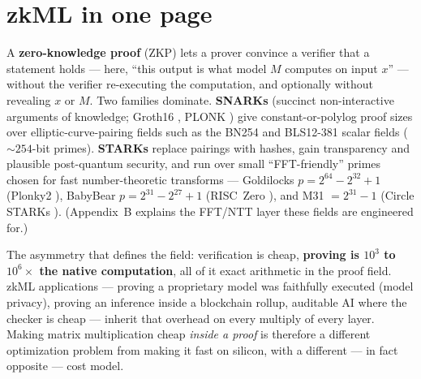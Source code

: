 \documentclass[10pt]{article}
\begin{document}
\begin{abstract}
{tax structurally}, proving at parity over identical traces; witness
generation inherits the exponent advantage with a crossover that is
field- \emph{and} substrate-dependent ($n \approx 64$ over
Goldilocks-CPU, $n \approx 10^3$ over BabyBear-CPU where 4-lane
NEON favors cheap multiplies, moot on the GPU where all algorithms
saturate memory bandwidth); and NTT field pricing is measured
across BabyBear, Goldilocks, BN254-Fr, and an Apple-GPU column. One
law organizes the machine-level results: the winning scheme is
decided by the substrate's scarce resource --- multiplies,
additions, or bytes --- and in modern AIR stacks the scarce
resource is committed rows, which is exactly what rank reduces. The
field-specific rank hunts continue.
\end{abstract}

\section{zkML in one page}\label{sec:zkml}

A \textbf{zero-knowledge proof} (ZKP) lets a prover convince a
verifier that a statement holds --- here, ``this output is what model
$M$ computes on input $x$'' --- without the verifier re-executing the
computation, and optionally without revealing $x$ or $M$. Two
families dominate. \textbf{SNARKs} (succinct non-interactive
arguments of knowledge; Groth16 \cite{groth16}, PLONK \cite{plonk})
give constant-or-polylog proof sizes over elliptic-curve-pairing
fields such as the BN254 and BLS12-381 scalar fields (${\sim}254$-bit
primes). \textbf{STARKs} \cite{stark} replace pairings with hashes,
gain transparency and plausible post-quantum security, and run over
small ``FFT-friendly'' primes chosen for fast number-theoretic
transforms --- Goldilocks $p = 2^{64} - 2^{32} + 1$ (Plonky2
\cite{plonky2}), BabyBear $p = 2^{31} - 2^{27} + 1$ (RISC~Zero
\cite{risc0}), and M31 $= 2^{31}-1$ (Circle STARKs \cite{circle}). (Appendix~B explains the FFT/NTT layer these fields are engineered for.)

The asymmetry that defines the field: verification is cheap,
\textbf{proving is $10^3$ to $10^6\times$ the native computation}, all
of it exact arithmetic in the proof field. zkML applications ---
proving a proprietary model was faithfully executed (model privacy),
proving an inference inside a blockchain rollup, auditable AI where
the checker is cheap --- inherit that overhead on every multiply of
every layer. Making matrix multiplication cheap \emph{inside a proof}
is therefore a different optimization problem from making it fast on
silicon, with a different --- in fact opposite --- cost model.
\end{document}
